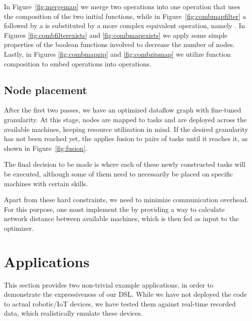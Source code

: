 \documentclass[sigplan,screen,10pt]{acmart}
\begin{document}

In Figure~\ref{fig:mergemap} we merge two  operations into
one  operation that uses the composition of the two initial
functions, while in Figure~\ref{fig:combmapfilter} a  followed
by a  is substituted by a more complex equivalent operation,
namely . In Figures \ref{fig:combfilterexists} and
\ref{fig:combmapexists} we apply some simple properties of the boolean functions
involved to decrease the number of nodes. Lastly, in Figures \ref{fig:combmapzip} and
\ref{fig:combzipmap} we utilize function composition to embed 
operations into  operations.

\subsection{Node placement}

After the first two passes, we have an optimized dataflow graph with fine-tuned
granularity. At this stage, nodes are mapped to tasks and are deployed across
the available machines, keeping resource utilization in mind.
If the desired granularity has not been reached yet, the
 applies fusion to pairs of tasks until it reaches
it, as shown in Figure~\ref{fig:fusion}.
%

The final decision to be made is where each of these newly constructed tasks
will be executed, although some of them need to necessarily be placed on
specific machines with certain skills.

Apart from these hard constraints, we need to minimize communication overhead.
For this purpose, one must implement the  by providing
a way to calculate network distance between available machines, which is then
fed as input to the  optimizer.

\section{Applications} \label{sec:applications}

This section provides two non-trivial example applications, in order to demonstrate
the expressiveness of our DSL.
While we have not deployed the code to actual robotic/IoT devices, we have tested
them against real-time recorded data, which realistically emulate these devices.
\end{document}
